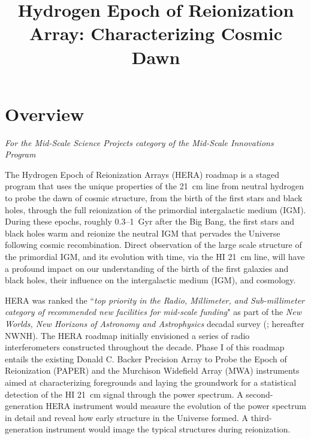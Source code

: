 \documentclass[preprint]{aastex}
\def\HI{{H{\small I }}}
\begin{document}
\title{Hydrogen Epoch of Reionization Array: Characterizing Cosmic Dawn}

\section{Overview} %



{\it For the Mid-Scale Science Projects category of the Mid-Scale
Innovations Program}

The Hydrogen Epoch of Reionization Arrays (HERA) roadmap is a staged
program that uses the unique properties of the 21~cm line from neutral
hydrogen to probe the dawn of cosmic structure, from the birth of the first 
stars and black holes, through the full reionization of the primordial
intergalactic medium (IGM). 
During these epochs, roughly 0.3--1~Gyr after the Big Bang, the
first stars and black holes warm and reionize the neutral
IGM that pervades the Universe following cosmic
recombination. Direct observation of the large scale structure of the primordial
IGM, and its evolution with time, via the \HI 21~cm line, will
have a profound impact on our understanding of the birth of the first
galaxies and black holes, their influence on the intergalactic medium
(IGM), and cosmology. 

HERA was ranked the ``{\it top priority in the Radio, Millimeter, and
Sub-millimeter category of recommended new facilities for mid-scale
funding}" as part of the {\it New Worlds, New Horizons of Astronomy
and Astrophysics} decadal survey (\citealt{astro2010}; hereafter
NWNH).  The HERA roadmap initially envisioned a series of radio
interferometers constructed throughout the decade. Phase I of this roadmap
entails the existing Donald C. Backer Precision Array to Probe the Epoch of
Reionization (PAPER) and the Murchison Widefield Array (MWA)
instruments aimed at characterizing foregrounds and laying the
groundwork for a statistical detection of the HI 21~cm signal through
the power spectrum.  A second-generation HERA instrument would measure
the evolution of the power spectrum in detail and reveal how early
structure in the Universe formed. A third-generation instrument would
image the typical structures during reionization.
\end{document}
